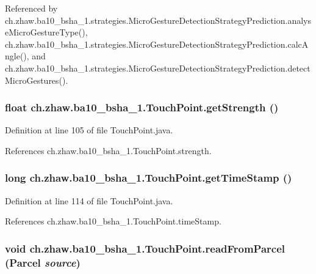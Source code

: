 Referenced by ch.zhaw.ba10\_\-bsha\_\-1.strategies.MicroGestureDetectionStrategyPrediction.analyseMicroGestureType(), ch.zhaw.ba10\_\-bsha\_\-1.strategies.MicroGestureDetectionStrategyPrediction.calcAngle(), and ch.zhaw.ba10\_\-bsha\_\-1.strategies.MicroGestureDetectionStrategyPrediction.detectMicroGestures().\hypertarget{classch_1_1zhaw_1_1ba10__bsha__1_1_1TouchPoint_a2297107f0bc05baf381fc9b8653a6df2}{
\subsubsection[{getStrength}]{\setlength{\rightskip}{0pt plus 5cm}float ch.zhaw.ba10\_\-bsha\_\-1.TouchPoint.getStrength ()}}
\label{classch_1_1zhaw_1_1ba10__bsha__1_1_1TouchPoint_a2297107f0bc05baf381fc9b8653a6df2}


Definition at line 105 of file TouchPoint.java.

References ch.zhaw.ba10\_\-bsha\_\-1.TouchPoint.strength.\hypertarget{classch_1_1zhaw_1_1ba10__bsha__1_1_1TouchPoint_aa25d5cf22375b6c5f8e59bccc2ec69d0}{
\subsubsection[{getTimeStamp}]{\setlength{\rightskip}{0pt plus 5cm}long ch.zhaw.ba10\_\-bsha\_\-1.TouchPoint.getTimeStamp ()}}
\label{classch_1_1zhaw_1_1ba10__bsha__1_1_1TouchPoint_aa25d5cf22375b6c5f8e59bccc2ec69d0}


Definition at line 114 of file TouchPoint.java.

References ch.zhaw.ba10\_\-bsha\_\-1.TouchPoint.timeStamp.\hypertarget{classch_1_1zhaw_1_1ba10__bsha__1_1_1TouchPoint_a23cc1e796d80c3fb6b7ca66fcecdd01e}{
\subsubsection[{readFromParcel}]{\setlength{\rightskip}{0pt plus 5cm}void ch.zhaw.ba10\_\-bsha\_\-1.TouchPoint.readFromParcel (Parcel {\em source})}}
\label{classch_1_1zhaw_1_1ba10__bsha__1_1_1TouchPoint_a23cc1e796d80c3fb6b7ca66fcecdd01e}


